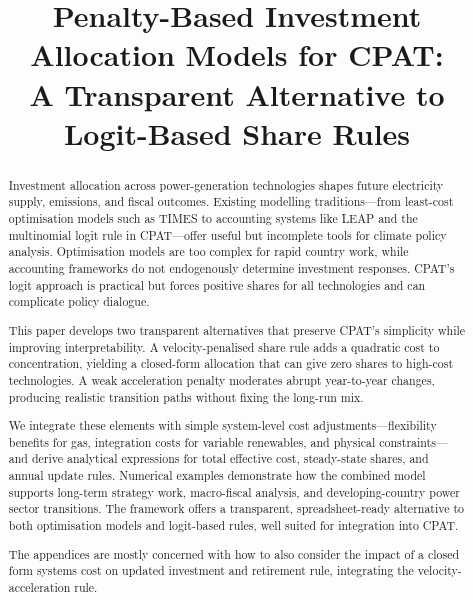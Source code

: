 \documentclass[preprint,authoryear,12pt]{elsarticle}
\begin{document}
\begin{frontmatter}

\title{
Penalty-Based Investment Allocation Models for CPAT:\\
A Transparent Alternative to Logit-Based Share Rules
}
\author{}







\newpage
\begin{abstract}
Investment allocation across power-generation technologies shapes future electricity supply,
emissions, and fiscal outcomes. Existing modelling traditions—from least-cost optimisation
models such as TIMES to accounting systems like LEAP and the multinomial logit rule in
CPAT—offer useful but incomplete tools for climate policy analysis. Optimisation models are too complex
for rapid country work, while accounting frameworks do not endogenously determine investment
responses. CPAT’s logit approach is practical but forces positive shares for all technologies and
can complicate policy dialogue.

This paper develops two transparent alternatives that preserve CPAT’s simplicity while improving
interpretability. A velocity-penalised share rule adds a quadratic cost to concentration,
yielding a closed-form allocation that can give zero shares to high-cost technologies. A weak
acceleration penalty moderates abrupt year-to-year changes, producing realistic transition paths
without fixing the long-run mix.

We integrate these elements with simple system-level cost adjustments—flexibility benefits for
gas, integration costs for variable renewables, and physical constraints—and derive analytical
expressions for total effective cost, steady-state shares, and annual update rules. Numerical
examples demonstrate how the combined model supports long-term strategy work, macro-fiscal
analysis, and developing-country power sector transitions. The framework offers a transparent,
spreadsheet-ready alternative to both optimisation models and logit-based rules, well suited for
integration into CPAT.

The appendices are mostly concerned with how to also consider the impact of a closed form systems cost on updated  investment and retirement rule, integrating the velocity-acceleration rule.
\end{abstract}




\end{frontmatter}
\end{document}
